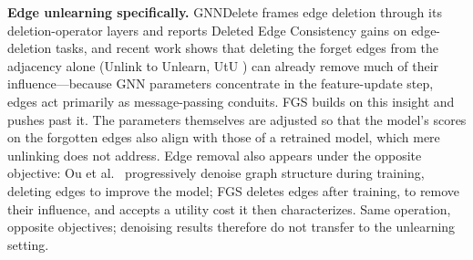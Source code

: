 \documentclass[pdflatex,sn-basic,Numbered]{sn-jnl}
\begin{document}
\textbf{Edge unlearning specifically.} GNNDelete frames edge deletion through its deletion-operator layers and reports Deleted Edge Consistency gains on edge-deletion tasks, and recent work shows that deleting the forget edges from the adjacency alone (Unlink to Unlearn, UtU \cite{utu2024}) can already remove much of their influence---because GNN parameters concentrate in the feature-update step, edges act primarily as message-passing conduits. FGS builds on this insight and pushes past it. The parameters themselves are adjusted so that the model's scores on the forgotten edges also align with those of a retrained model, which mere unlinking does not address. Edge removal also appears under the opposite objective: Ou et al.\ \cite{ou2026} progressively denoise graph structure during training, deleting edges to improve the model; FGS deletes edges after training, to remove their influence, and accepts a utility cost it then characterizes. Same operation, opposite objectives; denoising results therefore do not transfer to the unlearning setting.
\end{document}
